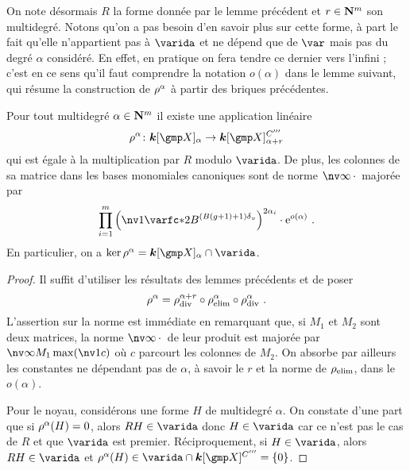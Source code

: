 On note désormais \( R \) la forme donnée par le lemme précédent et \( r \in
  {\mathbf{N}}^m \) son multidegré. Notons qu'on a pas besoin d'en savoir plus sur
cette forme, à part le fait qu'elle n'appartient pas à \( \varida \) et ne
dépend que de \( \var \) mais pas du degré \( \alpha \) considéré. En effet,
en pratique on fera tendre ce dernier vers l'infini ; c'est en ce sens qu'il
faut comprendre la notation \( o(\alpha) \) dans le lemme suivant, qui résume
la construction de \( \rho^\alpha \) à partir des briques précédentes.

\begin{lem} \label{l:rfull}
  Pour tout multidegré \( \alpha \in {\mathbf{N}}^m \) il existe une application
  linéaire
  \begin{equation}
    \rfull^\alpha \colon
    \cdn [\vmp]_ {\alpha}
    \to
    \cdn [\vmp]_ {\alpha+r}^{C'''}
  \end{equation}
  qui est égale à la multiplication par \( R \) modulo \( \varida \). De plus,
  les colonnes de sa matrice dans les bases monomiales canoniques sont de
  norme \( \nv\infty\truc \) majorée par
  \begin{equation}
    \prod\fctrange \left(
      \nv1{ \varfc* }
      2 B^{(B(\genre+1) + 1)\dv}
    \right) ^{ 2\alpha_\fct }
    \cdot \expb^{o(\alpha)}
    \pmm.
  \end{equation}
  En particulier, on a \( \ker \rfull^\alpha = \cdn[ \vmp ]_\alpha \cap
    \varida \).
\end{lem}

\begin{proof}
  Il suffit d'utiliser les résultats des lemmes précédents et de poser
  \begin{equation}
    \rho^\alpha
    =
    \rho\sb{\mathrm{div }}^{\alpha+r} \circ \rho\sb{\mathrm{elim}}^{\alpha} \circ \rho\sb{\mathrm{div }}^\alpha
    \text{ .}
  \end{equation}
  L'assertion sur la norme est immédiate en remarquant que, si \( M_1 \) et \(
    M_2 \) sont deux matrices, la norme \( \nv\infty\truc \) de leur produit
  est majorée par \( \nv\infty{M_1} \max(\nv1{c}) \) où \( c \) parcourt les
  colonnes de \( M_2 \). On absorbe par ailleurs les constantes ne dépendant
  pas de \( \alpha \), à savoir le \( r \) et la norme de \( \rho\sb{\mathrm{elim}} \), dans le
  \( o(\alpha) \).

  Pour le noyau, considérons une forme \( H \) de multidegré \( \alpha \). On
  constate d'une part que si \( \rho^\alpha(H) = 0 \), alors \( R H \in
    \varida \) donc \( H \in \varida \) car ce n'est pas le cas de \( R \) et
  que \( \varida \) est premier. Réciproquement, si \( H \in \varida \), alors
  \( RH \in \varida \) et \( \rfull^\alpha(H) \in \varida \cap \cdn[ \vmp
    ]^{C'''} = \set0 \).
\end{proof}

